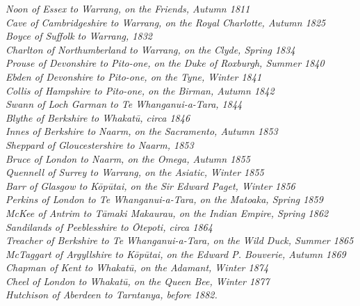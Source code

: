 \documentclass[
  a4paper,
]{scrbook}
\begin{document}
\begin{spacing}{1.2} 
\textit{Noon of Essex to Warrang, on the Friends, Autumn 1811} \\[5pt]
\textit{Cave of Cambridgeshire to Warrang, on the Royal Charlotte, Autumn 1825} \\[5pt]
\textit{Boyce of Suffolk to Warrang, 1832} \\[5pt] 
\textit{Charlton of Northumberland to Warrang, on the Clyde, Spring 1834} \\[5pt]
\textit{Prouse of Devonshire to Pito-one, on the Duke of Roxburgh, Summer 1840} \\[5pt]
\textit{Ebden of Devonshire to Pito-one, on the Tyne, Winter 1841} \\[5pt]
\textit{Collis of Hampshire to Pito-one, on the Birman, Autumn 1842} \\[5pt]
\textit{Swann of Loch Garman to Te Whanganui-a-Tara, 1844} \\[5pt] 
\textit{Blythe of Berkshire to Whakatū, circa 1846} \\[5pt]
\textit{Innes of Berkshire to Naarm, on the Sacramento, Autumn 1853} \\[5pt]
\textit{Sheppard of Gloucestershire to Naarm, 1853} \\[5pt] 
\textit{Bruce of London to Naarm, on the Omega, Autumn 1855} \\[5pt]
\textit{Quennell of Surrey to Warrang, on the Asiatic, Winter 1855} \\[5pt]
\textit{Barr of Glasgow to Kōpūtai, on the Sir Edward Paget, Winter 1856} \\[5pt] 
\textit{Perkins of London to Te Whanganui-a-Tara, on the Matoaka, Spring 1859} \\[5pt]
\textit{McKee of Antrim to Tāmaki Makaurau, on the Indian Empire, Spring 1862} \\[5pt]
\textit{Sandilands of Peeblesshire to Ōtepoti, circa 1864} \\[5pt] 
\textit{Treacher of Berkshire to Te Whanganui-a-Tara, on the Wild Duck, Summer 1865} \\[5pt]
\textit{McTaggart of Argyllshire to Kōpūtai, on the Edward P. Bouverie, Autumn 1869} \\[5pt] 
\textit{Chapman of Kent to Whakatū, on the Adamant, Winter 1874} \\[5pt]
\textit{Cheel of London to Whakatū, on the Queen Bee, Winter 1877} \\[5pt]  
\textit{Hutchison of Aberdeen to Tarntanya, before 1882.}
\end{spacing}
\end{document}
